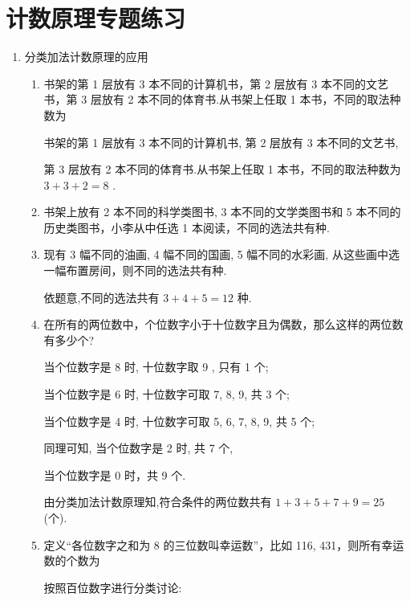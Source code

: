 \chapter*{计数原理专题练习}
\begin{enumerate}
    \item 分类加法计数原理的应用
    \begin{enumerate}
        \item 书架的第 1 层放有 3 本不同的计算机书，第 2 层放有 3 本不同的文艺书，第 3 层放有 2 本不同的体育书.从书架上任取 1 本书，不同的取法种数为

        \begin{jieda}
            书架的第 1 层放有 3 本不同的计算机书, 第 2 层放有 3 本不同的文艺书,
            
            第 3 层放有 2 本不同的体育书.从书架上任取 1 本书，不同的取法种数为 $3 + 3 + 2 = 8$ .
        \end{jieda}
        
        \item 书架上放有 2 本不同的科学类图书, 3 本不同的文学类图书和 5 本不同的历史类图书，小李从中任选 1 本阅读，不同的选法共有种.
        
        \item 现有 3 幅不同的油画, 4 幅不同的国画, 5 幅不同的水彩画, 从这些画中选一幅布置房间，则不同的选法共有种.
        \begin{jieda}
            依题意,不同的选法共有 $3 + 4 + 5 = {12}$ 种.
        \end{jieda}

        \item 在所有的两位数中，个位数字小于十位数字且为偶数，那么这样的两位数有多少个?
        \begin{jieda}
            当个位数字是 8 时, 十位数字取 9 , 只有 1 个;
            
            当个位数字是 6 时, 十位数字可取 7, 8, 9, 共 3 个;
            
            当个位数字是 4 时, 十位数字可取 5, 6, 7, 8, 9, 共 5 个;
            
            同理可知, 当个位数字是 2 时, 共 7 个,
            
            当个位数字是 0 时，共 9 个.
            
            由分类加法计数原理知,符合条件的两位数共有 $1 + 3 + 5 + 7 + 9 = {25}$ (个).
        \end{jieda}

        \item 定义“各位数字之和为 8 的三位数叫幸运数”，比如 116, 431，则所有幸运数的个数为
        \begin{jieda}
            按照百位数字进行分类讨论:
            

\end{jieda}
\end{enumerate}
\end{enumerate}
